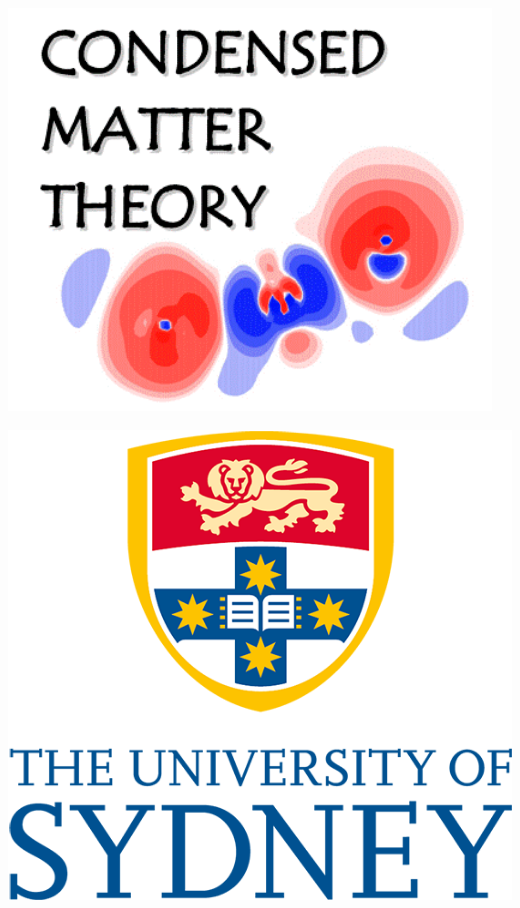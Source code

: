 \documentclass[a0paper,portrait]{baposter}
\begin{document}
\begin{poster}
{\begin{center}
\begin{minipage}{60pt}
        \includegraphics[width=\linewidth]{poster_figures/USyd_CMT.png}
    \end{minipage}
    \begin{minipage}{60pt}
        \includegraphics[width=\linewidth]{poster_figures/USyd_logo.png}
    \end{minipage}\end{center}
}



\end{poster}
\end{document}
